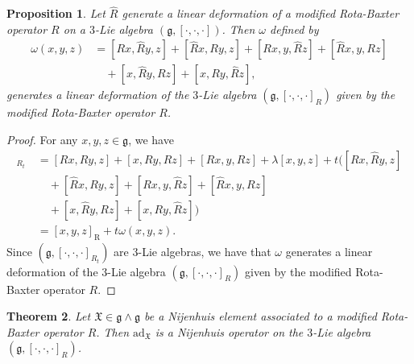 \documentclass[12pt]{amsart}
\newtheorem{theorem}{Theorem}[section]
\newtheorem{prop}[theorem]{Proposition}
\theoremstyle{definition}
\begin{document}
\begin{prop}
 Let $\hat{R}$ generate a linear deformation of a modified Rota-Baxter operator $R$ on a $3$-Lie algebra
$(\mathfrak{g}, [\cdot, \cdot, \cdot])$. Then $\omega$ defined by
\begin{align*}
\omega(x, y, z)&=[Rx, \hat{R}y, z]+[\hat{R}x, Ry, z]+[Rx, y, \hat{R}z]+[\hat{R}x, y, Rz]\\
&\quad+[x, \hat{R}y, Rz]+[x, Ry, \hat{R}z],
\end{align*}
generates a linear deformation of the $3$-Lie algebra $(\mathfrak{g}, [\cdot, \cdot, \cdot]_R)$ given by the modified Rota-Baxter operator $R$.
\end{prop}
\begin{proof}
For any  $x, y,z \in \mathfrak{g}$,  we have
\begin{align*}
[x, y, z]_{R_t}&=[Rx, Ry, z]+[x, Ry, Rz]+[Rx, y, Rz]+\lambda[x, y, z]+t([Rx, \hat{R}y, z]\\
\quad&\quad+[\hat{R}x, Ry, z]+[Rx, y, \hat{R}z]+[\hat{R}x, y, Rz]\\
\quad&\quad+[x, \hat{R}y, Rz]+[x, Ry, \hat{R}z])\\
&=[x, y, z]_{\mathrm{R}}+t\omega(x, y, z).
\end{align*}
 Since $(\mathfrak{g}, [\cdot, \cdot, \cdot]_{R_t})$ are $3$-Lie algebras, we have that $\omega$ generates a linear deformation of the $3$-Lie
 algebra $(\mathfrak{g}, [\cdot, \cdot, \cdot]_R)$ given by the modified Rota-Baxter operator $R$.
\end{proof}
 \begin{theorem}
Let $\mathfrak{X}\in \mathfrak{g}\wedge \mathfrak{g}$  be a Nijenhuis element associated to a modified Rota-Baxter operator $R$. Then $\mathrm{ad}_\mathfrak{X}$ is a
 Nijenhuis operator on the $3$-Lie algebra $(\mathfrak{g}, [\cdot, \cdot, \cdot]_R)$.
\end{theorem}
\end{document}

